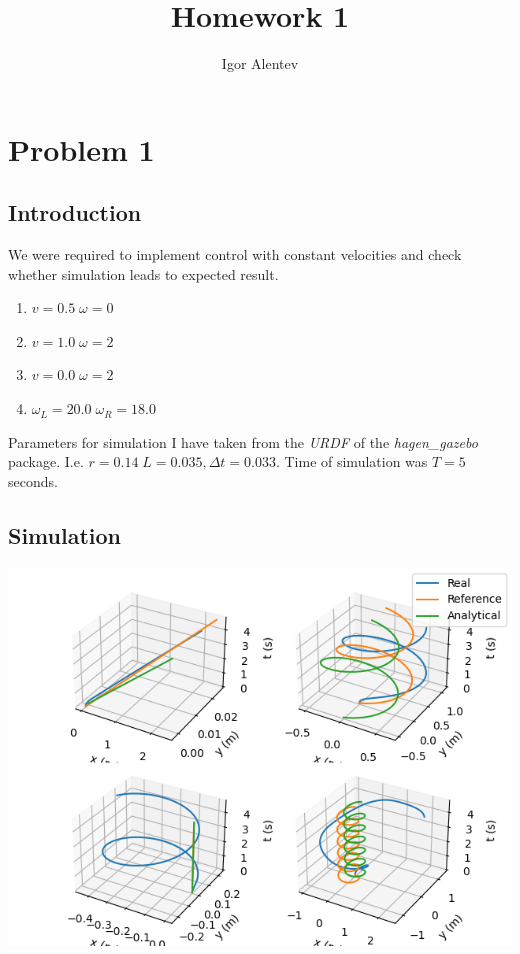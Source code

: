 \documentclass{article}
\title{Homework 1}
\author{Igor Alentev}
\begin{document}
\maketitle
\newpage

\section*{Problem 1}
\subsection*{Introduction}
We were required to implement control with constant velocities and check whether 
simulation leads to expected result.

\begin{enumerate}
        \item $v = 0.5\; \omega=0$
        \item $v = 1.0\; \omega=2$
        \item $v = 0.0\; \omega=2$
        \item $\omega_L = 20.0\; \omega_R=18.0$

\end{enumerate}

Parameters for simulation I have taken from the \textit{URDF} of the \textit{hagen\_gazebo} package.
I.e. $r=0.14\; L=0.035, \Delta t=0.033$. Time of simulation was $T=5$ seconds.

\subsection*{Simulation}

\includegraphics[scale=0.7]{3dtrajectories.png}
\end{document}
